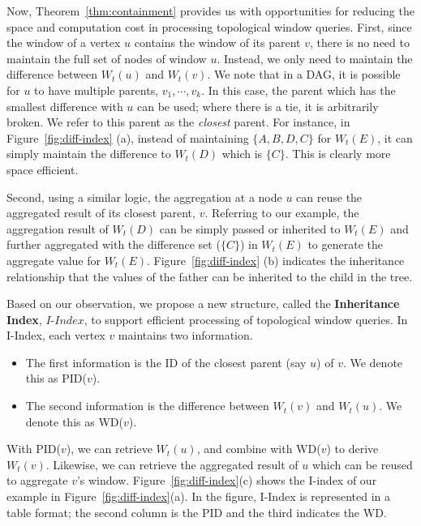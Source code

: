 Now, Theorem~\ref{thm:containment} provides us with opportunities for reducing
the space and computation cost in processing topological window queries. 
First, since the window of a vertex $u$ contains
the window of its parent $v$, there is no need to maintain
the full set of nodes of window $u$. Instead, we only
need to maintain the difference between $W_t(u)$ and $W_t(v)$.
We note that in a DAG, it is possible for $u$ to have
multiple parents, $v_1, \cdots, v_k$. In this case, the parent
which has the smallest difference with $u$ can be used; where there
is a tie, it is arbitrarily broken.
We refer to this parent as the {\em closest} parent. For instance, in Figure~\ref{fig:diff-index} (a), instead of maintaining 
$\{A, B, D, C\}$ for $W_t(E)$, it can simply maintain the difference 
to $W_t(D)$ which is $\{C\}$. This is clearly more space efficient.

Second, using a similar logic, the aggregation
at a node $u$ can reuse the 
aggregated result of its closest parent, $v$.
Referring to our example, the aggregation result of $W_t(D)$ can be 
simply passed or inherited to $W_t(E)$ and further aggregated with the difference 
set ($\{C\}$) in $W_t(E)$ to generate the aggregate value for $W_t(E)$. 
Figure~\ref{fig:diff-index} (b) indicates the inheritance relationship that 
the values of the father can be inherited to the child in the tree. 

Based on our observation, we propose a new structure, called the \textbf{Inheritance Index}, 
$I$-$Index$, to support efficient processing of topological window queries. 
In I-Index, each vertex $v$ maintains two information. 
\begin{itemize}
\item The first information is the ID of the closest parent (say $u$) 
of $v$. We denote this as PID($v$).
\item The second information is the difference between 
$W_t(v)$ and $W_t(u)$. We denote this as WD($v$). 
\end{itemize}

With PID($v$), we can retrieve $W_t(u)$, and combine with 
WD($v$) to derive $W_t(v)$. 
Likewise, we can retrieve the aggregated result of $u$ 
which can be reused to aggregate $v$'s window.
%
Figure~\ref{fig:diff-index}(c) shows the I-index of our example
in Figure~\ref{fig:diff-index}(a). In the figure, I-Index
is represented in a table format; 
the second column is the PID and the third indicates the WD. 

